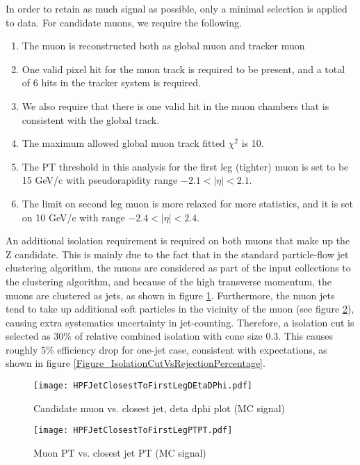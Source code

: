 \documentclass[10pt,a4paper,onecolumn]{article}
\begin{document}
In order to retain as much signal as possible, only a minimal selection is applied to data.
For candidate muons, we require the following.

\begin{enumerate}
\item The muon is reconstructed both as global muon and tracker muon
\item One valid pixel hit for the muon track is required to be present, and a total of 6 hits in the tracker system is required.
\item We also require that there is one valid hit in the muon chambers that is consistent with the global track.
\item The maximum allowed global muon track fitted $\chi^2$ is 10.
\item The PT threshold in this analysis for the first leg (tighter) muon is set to be 15 GeV/c with pseudorapidity range $-2.1 < |\eta| < 2.1$.
\item The limit on second leg muon is more relaxed for more statistics, and it is set on 10 GeV/c with range $-2.4 < |\eta| < 2.4$.
\end{enumerate}

An additional isolation requirement is required on both muons that make up the Z candidate.
This is mainly due to the fact that in the standard particle-flow jet clustering algorithm, the muons are considered as part
of the input collections to the clustering algorithm, and because of the high transverse momentum, the muons are clustered
as jets, as shown in figure \ref{Figure_CandidateMuonVsClosestJetEtaPhi}.  Furthermore, the muon jets tend to take up additional soft particles
in the vicinity of the muon (see figure \ref{Figure_CandidateMuonVsClosestJetPT}), causing extra systematics uncertainty in jet-counting.
Therefore, a isolation cut is selected as 30\% of relative combined isolation with cone size 0.3.  This causes roughly 5\%
efficiency drop for one-jet case, consistent with expectations, as shown in figure \ref{Figure_IsolationCutVsRejectionPercentage}.

\begin{figure}
\texttt{[image: HPFJetClosestToFirstLegDEtaDPhi.pdf]}
\caption{Candidate muon vs. closest jet, deta dphi plot (MC signal)}
\label{Figure_CandidateMuonVsClosestJetEtaPhi}
\end{figure}

\begin{figure}
\texttt{[image: HPFJetClosestToFirstLegPTPT.pdf]}
\caption{Muon PT vs. closest jet PT (MC signal)}
\label{Figure_CandidateMuonVsClosestJetPT}
\end{figure}
\end{document}

